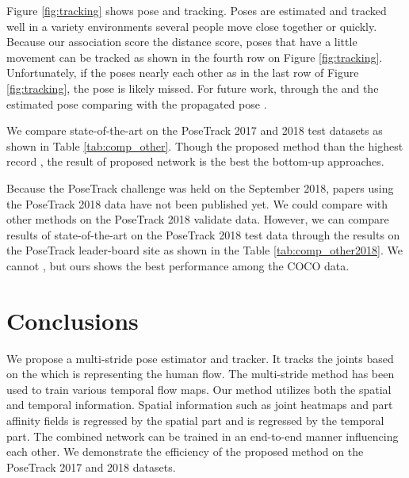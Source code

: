\documentclass[conference]{IEEEtran}
\begin{document}
Figure \ref{fig:tracking} shows  pose  and tracking. Poses are estimated and tracked well in a variety  environments  several people move close together or quickly. 
Because our association score  the distance score, poses that have a little movement can  be tracked as shown in the fourth row on Figure \ref{fig:tracking}.  
Unfortunately, if the poses nearly  each other as in the last row of Figure \ref{fig:tracking}, the pose is likely  missed. For future work,  through the 
and  the estimated pose  comparing  with the propagated pose .


We compare  state-of-the-art  on the PoseTrack 2017 and 2018 test datasets as shown in Table \ref{tab:comp_other}. Though the proposed method  than the highest record \cite{xiao2018simple}, the result of  proposed network is the best  the bottom-up approaches. 

Because the PoseTrack challenge was held on the September 2018, papers using the PoseTrack 2018 data have not been published yet. We could  compare  with other methods on the PoseTrack 2018 validate data. However, we can compare results of state-of-the-art on the PoseTrack 2018 test data through the results on the PoseTrack leader-board site as shown in the Table \ref{tab:comp_other2018}. We cannot , but ours shows the best performance among the   COCO data.


















\section{Conclusions}

We propose a multi-stride pose estimator and tracker. It tracks the joints based on the 
which is  representing the human flow. 
The multi-stride method has been used to train various temporal flow maps. 
Our method utilizes both the spatial and temporal information.
Spatial information such as joint heatmaps and part affinity fields is regressed by the spatial part and 
is regressed by the temporal part. 
The combined network can be trained in an end-to-end manner influencing each other.
We demonstrate the efficiency of the proposed method on the PoseTrack 2017 and 2018 datasets.









{\small




}
\end{document}
